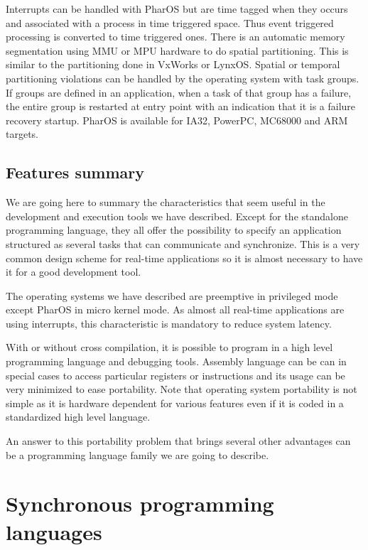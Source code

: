\documentclass[10pt]{report}
\begin{document}
Interrupts can be handled with PharOS but are time tagged when they occurs and associated with a process in time triggered
space. Thus event triggered processing is converted to time triggered ones. There is an automatic memory segmentation using MMU
or MPU hardware to do spatial partitioning. This is similar to the partitioning done in VxWorks or LynxOS. Spatial or temporal
partitioning violations can be handled by the operating system with task groups. If groups are defined in an application, when
a task of that group has a failure, the entire group is restarted at entry point with an indication that it is a failure
recovery startup. PharOS is available for IA32, PowerPC, MC68000 and ARM targets.

\subsection{Features summary}

We are going here to summary the characteristics that seem useful in the development and execution tools we have described. Except
for the standalone programming language, they all offer the possibility to specify an application structured as several tasks
that can communicate and synchronize. This is a very common design scheme for real-time applications so it is almost necessary
to have it for a good development tool.

The operating systems we have described are preemptive in privileged mode except PharOS in micro kernel mode. As almost all
real-time applications are using interrupts, this characteristic is mandatory to reduce system latency.

With or without cross compilation, it is possible to program in a high level programming language and debugging tools. Assembly
language can be can in special cases to access particular registers or instructions and its usage can be very minimized to ease
portability. Note that operating system portability is not simple as it is hardware dependent for various features even if
it is coded in a standardized high level language.

An answer to this portability problem that brings several other advantages can be a programming language family we are going to
describe.

\section{Synchronous programming languages}
\end{document}
